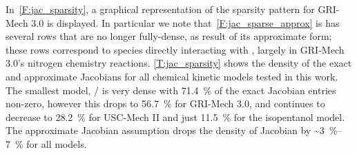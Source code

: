 \documentclass[12pt,number,sort&compress,preprint]{elsarticle}
\begin{document}
In~\cref{F:jac_sparsity}, a graphical representation of the sparsity pattern for GRI-Mech 3.0 is displayed.
In particular we note that~\cref{F:jac_sparse_approx} is has several rows that are no longer fully-dense, as result of its approximate form; these rows correspond to species directly interacting with , largely in GRI-Mech 3.0's nitrogen chemistry reactions.
\cref{T:jac_sparsity} shows the density of the exact and approximate Jacobians for all chemical kinetic models tested in this work.
The smallest model, \slash{} is very dense with \SI{71.4}{\percent} of the exact Jacobian entries non-zero, however this drops to \SI{56.7}{\percent} for GRI-Mech 3.0, and continues to decrease to \SI{28.2}{\percent} for USC-Mech II and just \SI{11.5}{\percent} for the isopentanol model.
The approximate Jacobian assumption drops the density of Jacobian by \textasciitilde\SIrange{3}{7}{\percent} for all models.
\end{document}
